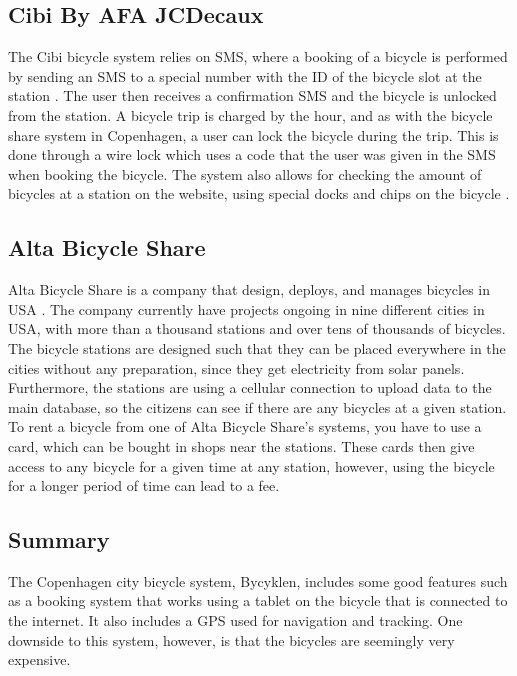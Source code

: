 \subsection{Cibi By AFA JCDecaux}
The Cibi bicycle system relies on SMS, where a booking of a bicycle is performed by sending an SMS to a special number with the ID of the bicycle slot at the station \citep{misc:cibi}. 
The user then receives a confirmation SMS and the bicycle is unlocked from the station. 
A bicycle trip is charged by the hour, and as with the bicycle share system in Copenhagen, a user can lock the bicycle during the trip. 
This is done through a wire lock which uses a code that the user was given in the SMS when booking the bicycle.
The system also allows for checking the amount of bicycles at a station on the website, using special docks and chips on the bicycle \citep{misc:omcibi}.

\subsection{Alta Bicycle Share}\label{subsec:alta}
Alta Bicycle Share is a company that design, deploys, and manages bicycles in USA \citep{misc:AltaBicycleShare}.
The company currently have projects ongoing in nine different cities in USA, with more than a thousand stations and over tens of thousands of bicycles.
The bicycle stations are designed such that they can be placed everywhere in the cities without any preparation, since they get electricity from solar panels.
Furthermore, the stations are using a cellular connection to upload data to the main database, so the citizens can see if there are any bicycles at a given station.
To rent a bicycle from one of Alta Bicycle Share's systems, you have to use a card, which can be bought in shops near the stations.
These cards then give access to any bicycle for a given time at any station, however, using the bicycle for a longer period of time can lead to a fee.

\subsection{Summary}
The Copenhagen city bicycle system, Bycyklen, includes some good features such as a booking system that works using a tablet on the bicycle that is connected to the internet.
It also includes a GPS used for navigation and tracking.
One downside to this system, however, is that the bicycles are seemingly very expensive.


